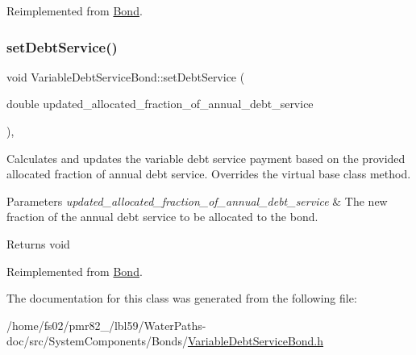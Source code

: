 Reimplemented from \mbox{\hyperlink{classBond_a726edbe3ea7047ebc7246585943763e3}{Bond}}.

\mbox{\label{classVariableDebtServiceBond_a692563150053b280f6e1ef23fd47c117}} 
\subsubsection{\texorpdfstring{set\+Debt\+Service()}{setDebtService()}}
{\footnotesize\ttfamily void Variable\+Debt\+Service\+Bond\+::set\+Debt\+Service (\begin{DoxyParamCaption}\item[{double}]{updated\+\_\+allocated\+\_\+fraction\+\_\+of\+\_\+annual\+\_\+debt\+\_\+service }\end{DoxyParamCaption})\hspace{0.3cm}{\ttfamily [override]}, {\ttfamily [virtual]}}



Calculates and updates the variable debt service payment based on the provided allocated fraction of annual debt service. Overrides the virtual base class method. 


\begin{DoxyParams}{Parameters}
{\em updated\+\_\+allocated\+\_\+fraction\+\_\+of\+\_\+annual\+\_\+debt\+\_\+service} & The new fraction of the annual debt service to be allocated to the bond.\\
\hline
\end{DoxyParams}
\begin{DoxyReturn}{Returns}
void 
\end{DoxyReturn}


Reimplemented from \mbox{\hyperlink{classBond_aff7fc4e1edcf199fb592d22c765b854e}{Bond}}.



The documentation for this class was generated from the following file\+:\begin{DoxyCompactItemize}
\item 
/home/fs02/pmr82\+\_/lbl59/\+Water\+Paths-\/doc/src/\+System\+Components/\+Bonds/\mbox{\hyperlink{VariableDebtServiceBond_8h}{Variable\+Debt\+Service\+Bond.\+h}}\end{DoxyCompactItemize}
